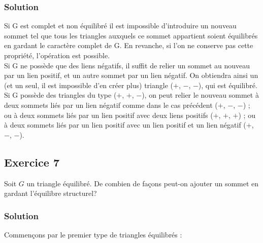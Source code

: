     \subsubsection*{Solution}
    Si G est complet et non équilibré il est impossible d’introduire un nouveau sommet tel que tous les triangles auxquels ce sommet appartient soient équilibrés en gardant le caractère complet de G.
    En revanche, si l'on ne conserve pas cette propriété, l'opération est possible.\\
    Si G ne possède que des liens négatifs, il suffit de relier un sommet au nouveau par un lien positif, et un autre sommet par un lien négatif.
    On obtiendra ainsi un (et un seul, il est impossible d'en créer plus) triangle ($+$, $-$, $-$), qui est équilibré.\\
    Si G possède des triangles du type ($+$, $+$, $-$), on peut relier le nouveau sommet à deux sommets liés par un lien négatif comme dans le cas précédent ($+$, $-$, $-$) ; ou à deux sommets liés par un lien positif avec deux liens positifs ($+$, $+$, $+$) ; ou à deux sommets liés par un lien positif avec un lien positif et un lien négatif ($+$, $-$, $-$).
    

\subsection*{Exercice 7}
Soit $G$ un triangle \'{e}quilibr\'{e}. De combien de fa\c{c}ons peut-on ajouter un sommet en gardant l'\'{e}quilibre structurel?

    \subsubsection*{Solution}
    Commençons par le premier type de triangles équilibrés :
    \begin{center}    
    \end{center}
    
